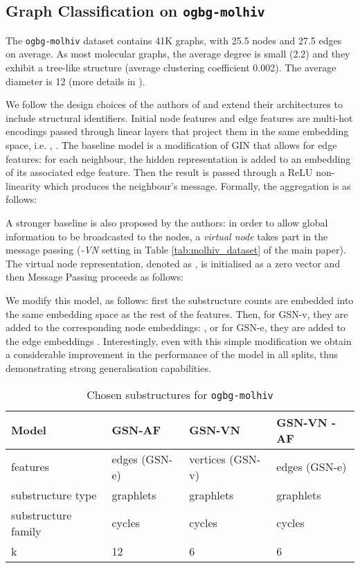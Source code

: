 \documentclass{article} \usepackage{iclr2021_conference,times}
\begin{document}
\subsection{Graph Classification on \texttt{ogbg-molhiv}}\label{app: molhiv}

The \texttt{ogbg-molhiv} dataset contains  41K graphs, with 25.5 nodes and 27.5 edges on average. As most molecular graphs, the average degree is small (2.2) and they exhibit a tree-like structure (average clustering coefficient 0.002). The average diameter is 12 (more details in \cite{DBLP:ogb}).

We follow the design choices of the authors of \cite{DBLP:ogb} and extend their architectures to include structural identifiers. Initial node features and edge features are multi-hot encodings passed through linear layers that project them in the same embedding space, i.e. , .
The baseline model is a modification of GIN that allows for edge features: for each neighbour, the hidden representation is added to an embedding of its associated edge feature. Then the result is passed through a ReLU non-linearity which produces the neighbour's message. Formally, the aggregation is as follows:

A stronger baseline is also proposed by the authors: in order to allow global information to be broadcasted to the nodes, a \textit{virtual node} takes part in the message passing (\textit{-VN} setting in Table \ref{tab:molhiv_dataset} of the main paper). The virtual node representation, denoted as , is initialised as a zero vector  and then Message Passing proceeds as follows:
  

We modify this model, as follows: first the substructure counts are embedded into the same embedding space as the rest of the features. Then, for GSN-v, they are added to the corresponding node embeddings:  , or for GSN-e, they are added to the edge embeddings . Interestingly, even with this simple modification we obtain a considerable improvement in the performance of the model in all splits, thus demonstrating strong generalisation capabilities.

\begin{table}[t]
    \centering
\caption{Chosen substructures for \texttt{ogbg-molhiv}}
    \label{tab:ogb_datasets_hyperparams}
    \begin{tabular}{llll}
Model & GSN-AF & GSN-VN & GSN-VN -AF\\
        \hline
        features
        & edges (GSN-e) &  vertices (GSN-v)&  edges (GSN-e) \\
        substructure type
        & graphlets &  graphlets& graphlets \\
        substructure family & cycles & cycles  &cycles \\
        k & 12 & 6 & 6 \\
\end{tabular}
\end{table}
\end{document}
